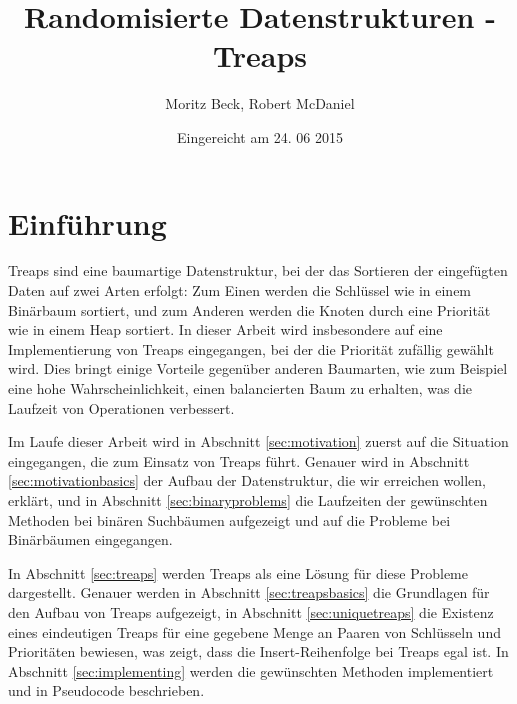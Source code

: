 \documentclass[a4paper]{scrreprt}
\theoremstyle{definition}
\begin{document}

\subject{Seminararbeit}
\title{Randomisierte Datenstrukturen - Treaps}
\author{Moritz Beck, Robert McDaniel}
\date{Eingereicht am 24. 06 2015} %
\titlehead{Julius-Maximilians-Universität Würzburg\\
Institut für Informatik\\
Lehrstuhl für Informatik I\\
Effiziente Algorithmen und wissensbasierte Systeme}
\publishers{Betreuer:\\
Prof.\ Dr.\ Alexander Wolff\\
Dipl.-Inf.\ Philipp Kindermann}
\maketitle
\tableofcontents


\chapter{Einführung}
\label{sec:intro}

Treaps sind eine baumartige Datenstruktur, bei der das Sortieren der eingefügten Daten auf zwei Arten erfolgt:
Zum Einen werden die Schlüssel wie in einem Binärbaum sortiert, und zum Anderen werden die Knoten durch eine Priorität wie in einem Heap sortiert.
In dieser Arbeit wird insbesondere auf eine Implementierung von Treaps eingegangen, bei der die Priorität zufällig gewählt wird.
Dies bringt einige Vorteile gegenüber anderen Baumarten, wie zum Beispiel eine hohe Wahrscheinlichkeit, einen balancierten Baum zu erhalten, was die Laufzeit von Operationen verbessert.

Im Laufe dieser Arbeit wird in Abschnitt \ref{sec:motivation} zuerst auf die Situation eingegangen, die zum Einsatz von Treaps führt.
Genauer wird in Abschnitt \ref{sec:motivationbasics} der Aufbau der Datenstruktur, die wir erreichen wollen, erklärt, und in Abschnitt \ref{sec:binaryproblems} die Laufzeiten der gewünschten Methoden bei binären Suchbäumen aufgezeigt und auf die Probleme bei Binärbäumen eingegangen.

In Abschnitt \ref{sec:treaps} werden Treaps als eine Lösung für diese Probleme dargestellt.
Genauer werden in Abschnitt \ref{sec:treapsbasics} die Grundlagen für den Aufbau von Treaps aufgezeigt, in Abschnitt \ref{sec:uniquetreaps} die Existenz eines eindeutigen Treaps für eine gegebene Menge an Paaren von Schlüsseln und Prioritäten bewiesen, was zeigt, dass die Insert-Reihenfolge bei Treaps egal ist. In Abschnitt \ref{sec:implementing} werden die gewünschten Methoden implementiert und in Pseudocode beschrieben.
\end{document}
